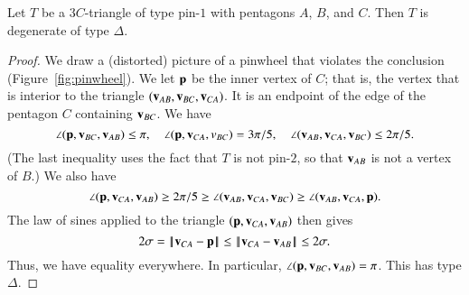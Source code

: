 
\begin{lemma} Let $T$ be a $3C$-triangle of type pin-$1$ with
  pentagons $A$, $B$, and $C$.  Then $T$ is degenerate of type
  $\Delta$.
\end{lemma}


\begin{proof}  We draw a (distorted) picture of a
  pinwheel that violates the conclusion (Figure~\ref{fig:pinwheel}).
  We let ${\mathbf p}$ be the inner vertex of $C$; that is, the vertex that is
  interior to the triangle $({\mathbf v}_{AB},{\mathbf v}_{BC},{\mathbf v}_{CA})$.  It is an
  endpoint of the edge of the pentagon $C$ containing ${\mathbf v}_{BC}$.  We have
\[
\angle ({\mathbf p},{\mathbf v}_{BC},{\mathbf v}_{AB}) \le \pi,\quad \angle({\mathbf p},{\mathbf v}_{CA},v_{BC}) = 3\pi/5,\quad
\angle({\mathbf v}_{AB},{\mathbf v}_{CA},{\mathbf v}_{BC})\le 2\pi/5.
\]
(The last inequality uses the fact that $T$ is not pin-$2$, so
that ${\mathbf v}_{AB}$ is not a vertex of $B$.)
We also have
\[
\angle({\mathbf p},{\mathbf v}_{CA},{\mathbf v}_{AB}) \ge 2\pi /5 \ge \angle({\mathbf v}_{AB},{\mathbf v}_{CA},{\mathbf v}_{BC}) \ge \angle({\mathbf v}_{AB},{\mathbf v}_{CA},{\mathbf p}).
\]
The law of sines applied to the triangle $({\mathbf p},{\mathbf v}_{CA},{\mathbf v}_{AB})$ then gives
\[
2\sigma =\norm{\v_{CA}}{\p}\le\norm{\v_{CA}}{\v_{AB}}\le 2\sigma.
\]
Thus, we have equality everywhere.  In particular, $\angle({\mathbf p},{\mathbf v}_{BC},{\mathbf v}_{AB})=\pi$.  This
has type $\Delta$.
\end{proof}

